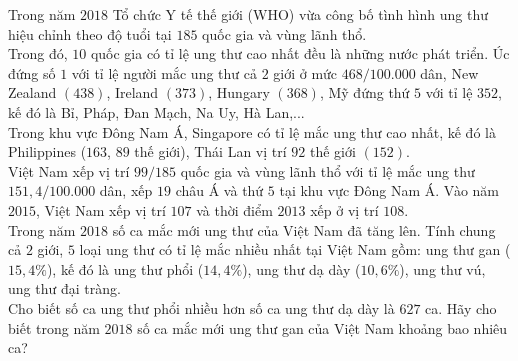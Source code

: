 \begin{bt}%
	Trong năm $2018$ Tổ chức Y tế thế giới (WHO) vừa công bố tình hình ung thư hiệu chỉnh theo độ tuổi tại $185$ quốc gia và vùng lãnh thổ.\\
	Trong đó, $10$ quốc gia có tỉ lệ ung thư cao nhất đều là những nước phát triển. Úc đứng số $1$ với tỉ lệ người mắc ung thư cả $2$ giới ở mức $468/100.000$ dân, New Zealand $(438)$, Ireland $(373)$, Hungary $(368)$, Mỹ đứng thứ $5$ với tỉ lệ $352$, kế đó là Bỉ, Pháp, Đan Mạch, Na Uy, Hà Lan,...\\
	Trong khu vực Đông Nam Á, Singapore có tỉ lệ mắc ung thư cao nhất, kế đó là Philippines ($163$, $89$ thế giới), Thái Lan vị trí $92$ thế giới $(152)$.\\
	Việt Nam xếp vị trí $99/185$ quốc gia và vùng lãnh thổ với tỉ lệ mắc ung thư $151{,}4/100.000$ dân, xếp $19$ châu Á và thứ $5$ tại khu vực Đông Nam Á. Vào năm $2015$, Việt Nam xếp vị trí $107$ và thời điểm $2013$ xếp ở vị trí $108$.\\
	Trong năm $2018$ số ca mắc mới ung thư của Việt Nam đã tăng lên. Tính chung cả $2$ giới, $5$ loại ung thư có tỉ lệ mắc nhiều nhất tại Việt Nam gồm: ung thư gan ($15{,}4\%$), kế đó là ung thư phổi ($14{,}4\%$), ung thư dạ dày ($10{,}6\%$), ung thư vú, ung thư đại tràng.\\
	Cho biết số ca ung thư phổi nhiều hơn số ca ung thư dạ dày là $627$ ca. Hãy cho biết trong năm $2018$ số ca mắc mới ung thư gan của Việt Nam khoảng bao nhiêu ca?
\end{bt}

